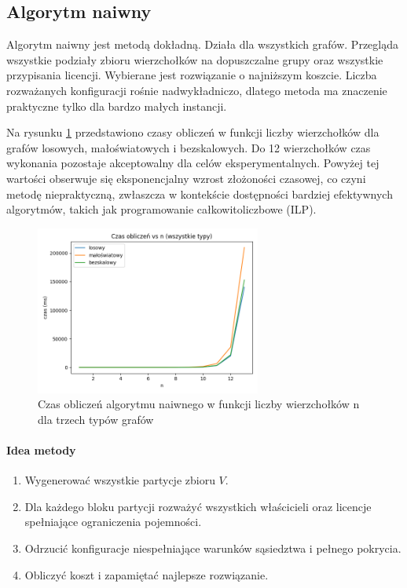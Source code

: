 \subsection{Algorytm naiwny}\label{subsec:naive}
Algorytm naiwny jest metodą dokładną. Działa dla wszystkich grafów. Przegląda wszystkie podziały zbioru wierzchołków na dopuszczalne grupy oraz wszystkie przypisania licencji. Wybierane jest rozwiązanie o najniższym koszcie. Liczba rozważanych konfiguracji rośnie nadwykładniczo, dlatego metoda ma znaczenie praktyczne tylko dla bardzo małych instancji.

Na rysunku \ref{fig:all_types_time} przedstawiono czasy obliczeń w funkcji liczby wierzchołków dla grafów losowych, małoświatowych i bezskalowych. Do 12 wierzchołków czas wykonania pozostaje akceptowalny dla celów eksperymentalnych. Powyżej tej wartości obserwuje się eksponencjalny wzrost złożoności czasowej, co czyni metodę niepraktyczną, zwłaszcza w kontekście dostępności bardziej efektywnych algorytmów, takich jak programowanie całkowitoliczbowe (ILP).

\begin{figure}[H]
  \centering
  \includegraphics[width=0.66\textwidth]{assets/all_types_plot.png}
  \caption{Czas obliczeń algorytmu naiwnego w funkcji liczby wierzchołków n dla trzech typów grafów}
  \label{fig:all_types_time}
\end{figure}

\paragraph{Idea metody}
\begin{enumerate}
  \item Wygenerować wszystkie partycje zbioru \(V\).
  \item Dla każdego bloku partycji rozważyć wszystkich właścicieli oraz licencje spełniające ograniczenia pojemności.
  \item Odrzucić konfiguracje niespełniające warunków sąsiedztwa i pełnego pokrycia.
  \item Obliczyć koszt i zapamiętać najlepsze rozwiązanie.
\end{enumerate}

